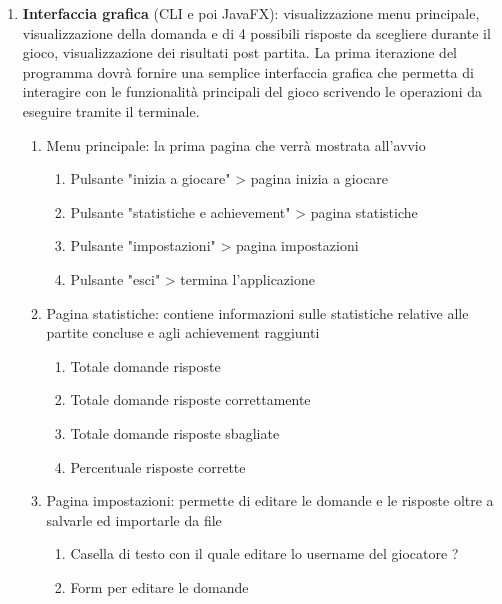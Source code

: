 \begin{enumerate}
            \item \textbf{Interfaccia grafica} (CLI e poi JavaFX): visualizzazione menu principale, visualizzazione della domanda e di 4 possibili risposte da scegliere durante il gioco, visualizzazione dei risultati post partita. La prima iterazione del programma dovrà fornire una semplice interfaccia grafica che permetta di interagire con le funzionalità principali del gioco scrivendo le operazioni da eseguire tramite il terminale.
                \begin{enumerate}
                    \item Menu principale: la prima pagina che verrà mostrata all'avvio
                        \begin{enumerate}
                            \item Pulsante "inizia a giocare" > pagina inizia a giocare
                            \item Pulsante "statistiche e achievement" > pagina statistiche
                            \item Pulsante "impostazioni" > pagina impostazioni
                            \item Pulsante "esci" > termina l'applicazione
                        \end{enumerate}
                    \item Pagina statistiche: contiene informazioni sulle statistiche relative alle partite concluse e agli achievement raggiunti
                        \begin{enumerate}
                            \item Totale domande risposte
                            \item Totale domande risposte correttamente
                            \item Totale domande risposte sbagliate
                            \item Percentuale risposte corrette
                        \end{enumerate}
                    \item Pagina impostazioni: permette di editare le domande e le risposte oltre a salvarle ed importarle da file
                        \begin{enumerate}
                            \item Casella di testo con il quale editare lo username del giocatore ?
                            \item Form per editare le domande

\end{enumerate}
\end{enumerate}
\end{enumerate}
